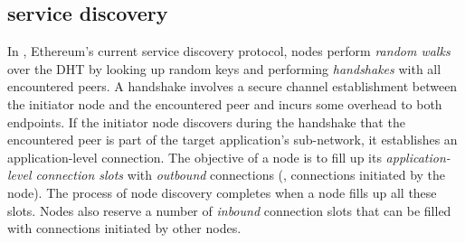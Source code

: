





\subsection{\discv service discovery}
\label{sec:background:discv4}

In \discv, Ethereum's current service discovery protocol, nodes perform \textit{random walks} over the DHT by looking up random keys and performing \emph{handshakes} with all encountered peers.
A handshake involves a secure channel establishment between the initiator node and the encountered peer and incurs some overhead to both endpoints.
If the initiator node discovers during the handshake that the encountered peer is part of the target application's sub-network, it establishes an application-level connection.
The objective of a node is to fill up its \textit{application-level connection slots} with \emph{outbound}  connections (\ie, connections initiated by the node).
The process of node discovery completes when a node fills up all these slots.
Nodes also reserve a number of \emph{inbound} connection slots that can be filled with connections initiated by other nodes. 

